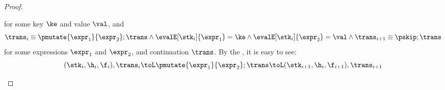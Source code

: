 \begin{proof}
\begin{itemize}
\begin{itemize}
\[                \]
                for some key \( \ke \) and value \( \val \), and
                \[
                    \trans_{i} \equiv \pmutate{\expr_1}{\expr_2} ; \trans 
                    \land \evalE[\stk_i]{\expr_1} = \ke 
                    \land \evalE[\stk_i]{\expr_2} = \val 
                    \land  \trans_{i+1} \equiv \pskip ; \trans
                \]
                for some expressions \( \expr_1 \) and \( \expr_2 \), and continuation \( \trans \).
                By the , it is easy to see: 
                \[
                    (\stk_i, \h_i, \f_i), \trans_i \toL \pmutate{\expr_1}{\expr_2} ; \trans 
                    \toL (\stk_{i+1}, \h_i, \f_{i+1} ), \trans_{i+1}
                \]
        \end{itemize}
    \end{itemize}
\end{proof}

